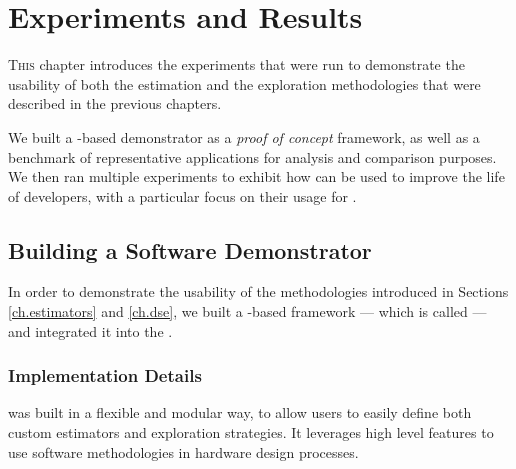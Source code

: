 \chapter{Experiments and Results}


\lettrine[lines=2]{T}{his} chapter introduces the experiments that were run to demonstrate the usability of both the estimation and the exploration methodologies that were described in the previous chapters.

We built a \chisel-based demonstrator as a {\it proof of concept} framework, as well as a benchmark of representative applications for analysis and comparison purposes.
We then ran multiple experiments to exhibit how  can be used to improve the life of developers, with a particular focus on their usage for .

\vspace*{\fill}
\minitoc 
\mtcskip 

\newpage

\section{Building a Software Demonstrator}
\label{ch.expe:sec.qece}
    In order to demonstrate the usability of the methodologies introduced in Sections \ref{ch.estimators} and \ref{ch.dse}, we built a \chisel-based framework --- which is called  --- and integrated it into the .

    \subsection{Implementation Details}
    \label{ch.expe:sec.qece:ssec.impl}

         was built in a flexible and modular way, to allow users to easily define both custom estimators and exploration strategies.
        It leverages \scala{} high level features to use software methodologies in hardware design processes.
        
